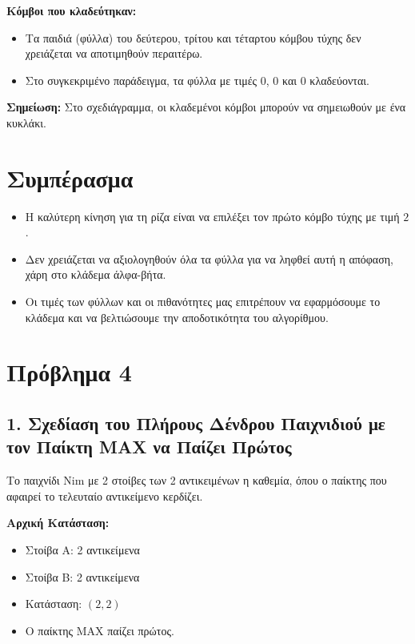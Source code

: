 \documentclass{article}
\begin{document}
\textbf{Κόμβοι που κλαδεύτηκαν:}

\begin{itemize}
    \item Τα παιδιά (φύλλα) του δεύτερου, τρίτου και τέταρτου κόμβου τύχης δεν χρειάζεται να αποτιμηθούν περαιτέρω.
    \item Στο συγκεκριμένο παράδειγμα, τα φύλλα με τιμές \(0\), \(0\) και \(0\) κλαδεύονται.
\end{itemize}

\textbf{Σημείωση:} Στο σχεδιάγραμμα, οι κλαδεμένοι κόμβοι μπορούν να σημειωθούν με ένα κυκλάκι.

\section*{Συμπέρασμα}

\begin{itemize}
    \item Η καλύτερη κίνηση για τη ρίζα είναι να επιλέξει τον πρώτο κόμβο τύχης με τιμή \(2\).
    \item Δεν χρειάζεται να αξιολογηθούν όλα τα φύλλα για να ληφθεί αυτή η απόφαση, χάρη στο κλάδεμα άλφα-βήτα.
    \item Οι τιμές των φύλλων και οι πιθανότητες μας επιτρέπουν να εφαρμόσουμε το κλάδεμα και να βελτιώσουμε την αποδοτικότητα του αλγορίθμου.
\end{itemize}

\section*{Πρόβλημα 4}

\subsection*{1. Σχεδίαση του Πλήρους Δένδρου Παιχνιδιού με τον Παίκτη MAX να Παίζει Πρώτος}

Το παιχνίδι Nim με 2 στοίβες των 2 αντικειμένων η καθεμία, όπου ο παίκτης που αφαιρεί το τελευταίο αντικείμενο κερδίζει.

\textbf{Αρχική Κατάσταση:}
\begin{itemize}
    \item Στοίβα A: 2 αντικείμενα
    \item Στοίβα B: 2 αντικείμενα
    \item Κατάσταση: $(2, 2)$
    \item Ο παίκτης MAX παίζει πρώτος.
\end{itemize}
\end{document}
